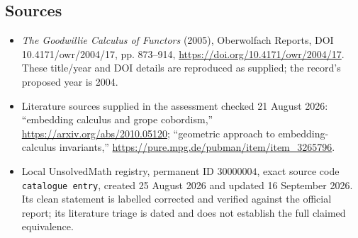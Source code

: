 \documentclass[11pt]{article}
\begin{document}
\subsection{Sources}
\begin{itemize}
\item \emph{The Goodwillie Calculus of Functors} (2005), Oberwolfach Reports, DOI 10.4171/owr/2004/17, pp. 873--914, \url{https://doi.org/10.4171/owr/2004/17}. These title/year and DOI details are reproduced as supplied; the record's proposed year is 2004.
\item Literature sources supplied in the assessment checked 21 August 2026: ``embedding calculus and grope cobordism,'' \url{https://arxiv.org/abs/2010.05120}; ``geometric approach to embedding-calculus invariants,'' \url{https://pure.mpg.de/pubman/item/item_3265796}.
\item Local UnsolvedMath registry, permanent ID $30000004$, exact source code \texttt{catalogue entry}, created 25 August 2026 and updated 16 September 2026. Its clean statement is labelled corrected and verified against the official report; its literature triage is dated and does not establish the full claimed equivalence.
\end{itemize}
\end{document}
